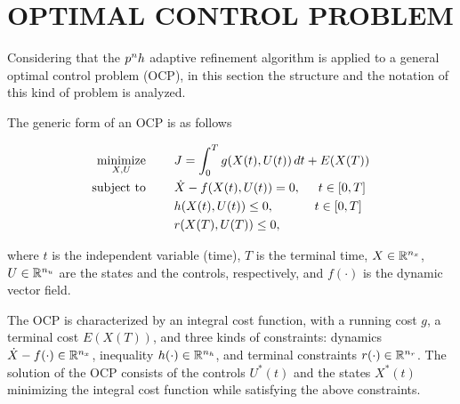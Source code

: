 \section*{OPTIMAL CONTROL PROBLEM}

Considering that the $p^{n}h$ adaptive refinement algorithm is applied to a general optimal control problem (OCP), in this section the structure and the notation of this kind of problem is analyzed.


The generic form of an OCP is as follows


\begin{subequations}\label{OCP}
	\begin{align}
	\underset{X,U}{\text{minimize}}\hspace{8mm} &J = \int_{0}^{T}g(X(t),U(t))\,dt + E(X(T)) \label{eq:cost}\\
	\text{subject to} \hspace{8mm} &\dot{X} -  f(X(t),U(t)) = 0, \hspace{5mm} t \in[0,T] \label{eq:dyn}\\
	& h(X(t),U(t)) \leq 0,  \hspace{11.5mm} t \in[0,T] \label{eq:path}\\
	& r(X(T),U(T)) \leq 0, \label{eq:terminal}		
	\end{align}
\end{subequations}

where $t$ is the independent variable (time), $T$ is the terminal time, $X \in \mathbb{R}^{n_{x}}$, $U \in \mathbb{R}^{n_{u}}$ are the states and the controls, respectively, and $f (\cdot)$ is the dynamic vector field.

The OCP is characterized by an integral cost function, with a running cost $g$, a terminal cost $E(X(T))$, and three kinds of constraints: dynamics $\dot{X}-f(\cdot) \in \mathbb{R}^{n_{x}}$, inequality $h(\cdot) \in \mathbb{R}^{n_{h}}$, and terminal constraints $r(\cdot) \in \mathbb{R}^{n_{r}}$.
The solution of the OCP  consists of the controls $U^{*}(t)$ and the states $X^*(t)$  minimizing the integral cost function while satisfying the above constraints.


